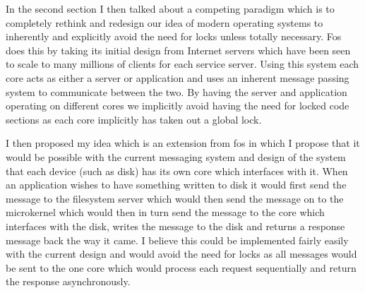 \documentclass[journal]{IEEEtran}
\begin{document}
In the second section I then talked about a competing paradigm which is to completely rethink and redesign our idea of modern operating systems to inherently and explicitly avoid the need for locks unless totally necessary. Fos \cite{fos} does this by taking its initial design from Internet servers which have been seen to scale to many millions of clients for each service server. Using this system each core acts as either a server or application and uses an inherent message passing system to communicate between the two. By having the server and application operating on different cores we implicitly avoid having the need for locked code sections as each core implicitly has taken out a global lock.

I then proposed my idea which is an extension from fos in which I propose that it would be possible with the current messaging system and design of the system that each device (such as disk) has its own core which interfaces with it. When an application wishes to have something written to disk it would first send the message to the filesystem server which would then send the message on to the microkernel which would then in turn send the message to the core which interfaces with the disk, writes the message to the disk and returns a response message back the way it came. I believe this could be implemented fairly easily with the current design and would avoid the need for locks as all messages would be sent to the one core which would process each request sequentially and return the response asynchronously.




\end{document}
